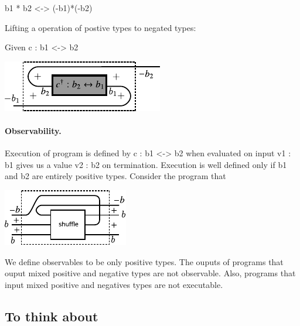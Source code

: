 \documentclass[preprint]{sigplanconf}
\begin{document}
{{b1 * b2 <-> (-b1)*(-b2)}}


Lifting a operation of postive types to negated types:

Given {{c : b1 <-> b2}}

\begin{center}
  \includegraphics{diagrams/neg_lift.pdf}
\end{center}

\paragraph*{Observability.} 
Execution of program is defined by {{c : b1 <-> b2}} when evaluated on
input {{v1 : b1}} gives us a value {{v2 : b2}} on
termination. Execution is well defined only if {{b1}} and {{b2}} are
entirely positive types. Consider the program that

\begin{center}
  \includegraphics{diagrams/shuffle.pdf}
\end{center}

We define observables to be only positive types. The ouputs of
programs that ouput mixed positive and negative types are not
observable.  Also, programs that input mixed positive and negatives
types are not executable.

\subsection{To think about}
\end{document}
